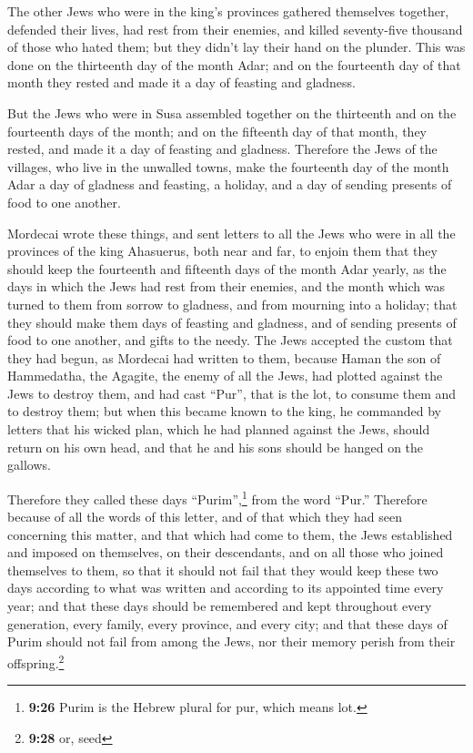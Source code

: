  The other Jews who were in the king's provinces gathered
themselves together, defended their lives, had rest from their enemies,
and killed seventy-five thousand of those who hated them; but they
didn't lay their hand on the plunder.  This was done on
the thirteenth day of the month Adar; and on the fourteenth day of that
month they rested and made it a day of feasting and gladness.

 But the Jews who were in Susa assembled together on the
thirteenth and on the fourteenth days of the month; and on the fifteenth
day of that month, they rested, and made it a day of feasting and
gladness.  Therefore the Jews of the villages, who live
in the unwalled towns, make the fourteenth day of the month Adar a day
of gladness and feasting, a holiday, and a day of sending presents of
food to one another.

 Mordecai wrote these things, and sent letters to all the
Jews who were in all the provinces of the king Ahasuerus, both near and
far,  to enjoin them that they should keep the fourteenth
and fifteenth days of the month Adar yearly,  as the days
in which the Jews had rest from their enemies, and the month which was
turned to them from sorrow to gladness, and from mourning into a
holiday; that they should make them days of feasting and gladness, and
of sending presents of food to one another, and gifts to the needy.
 The Jews accepted the custom that they had begun, as
Mordecai had written to them,  because Haman the son of
Hammedatha, the Agagite, the enemy of all the Jews, had plotted against
the Jews to destroy them, and had cast ``Pur'', that is the lot, to
consume them and to destroy them;  but when this became
known to the king, he commanded by letters that his wicked plan, which
he had planned against the Jews, should return on his own head, and that
he and his sons should be hanged on the gallows.

 Therefore they called these days ``Purim'',\footnote{\textbf{9:26}
  Purim is the Hebrew plural for pur, which means lot.} from the word
``Pur.'' Therefore because of all the words of this letter, and of that
which they had seen concerning this matter, and that which had come to
them,  the Jews established and imposed on themselves, on
their descendants, and on all those who joined themselves to them, so
that it should not fail that they would keep these two days according to
what was written and according to its appointed time every year;
 and that these days should be remembered and kept
throughout every generation, every family, every province, and every
city; and that these days of Purim should not fail from among the Jews,
nor their memory perish from their offspring.\footnote{\textbf{9:28} or,
  seed}

